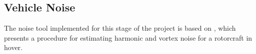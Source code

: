 \subsection{Vehicle Noise}

The noise tool implemented for this stage of the project is based on \cite{Brown2018}, which presents a procedure for estimating harmonic and vortex noise for a rotorcraft in hover.



